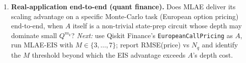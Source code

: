 \begin{enumerate}
  \item \textbf{Real-application end-to-end (quant finance).} Does MLAE
        deliver its scaling advantage on a specific Monte-Carlo task
        (European option pricing) end-to-end, when $A$ itself is a
        non-trivial state-prep circuit whose depth may dominate small
        $Q^{m_k}$?  \emph{Next:} use Qiskit Finance's
        \texttt{EuropeanCallPricing} as $A$, run MLAE-EIS with $M\in\{3,\dots,7\}$;
        report RMSE(price) vs $N_q$ and identify the $M$ threshold beyond
        which the EIS advantage exceeds $A$'s depth cost.
\end{enumerate}
